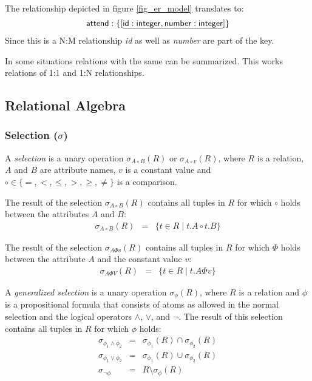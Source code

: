 \begin{example}
The relationship depicted in figure \ref{fig_er_model} translates to:
\[
\mathsf{attend : \{[\underline{id:integer, number:integer}]\}}
\]
Since this is a N:M relationship \textit{id} as well as \textit{number} are part of the key.
\end{example}

In some situations relations with the same can be summarized. This works relations of 1:1 and 1:N relationships.




\subsection{Relational Algebra}




\subsubsection[Selection]{Selection ($\sigma$)}

A \emph{selection} is a unary operation $\sigma_{A \circ  B}(R)$ or $\sigma_{A \circ v}(R)$, where $R$ is a relation, $A$ and $B$ are attribute names, $v$ is a constant value and $\circ \in \{=,<,\leq,>,\geq,\neq\}$ is a comparison.

The result of the selection $\sigma_{A \circ B}(R)$ contains all tuples in $R$ for which $\circ$ holds between the attributes $A$ and $B$:
\[ \begin{array}{rcl}
\sigma_{A \circ B}(R) & = & \{ t \in R \mid t.A \circ t.B \}
\end{array} \]

The result of the selection $\sigma_{A \Phi v}(R)$ contains all tuples in $R$ for which $\Phi$ holds between the attribute $A$ and the constant value $v$:
\[ \begin{array}{rcl}
\sigma_{A \Phi V}(R) & = & \{ t \in R \mid t.A \Phi v \}
\end{array} \]

A \emph{generalized selection} is a unary operation $\sigma_\phi(R)$, where $R$ is a relation and $\phi$ is a propositional formula that consists of atoms as allowed in the normal selection and the logical operators $\wedge$, $\vee$, and $\neg$. The result of this selection contains all tuples in $R$ for which $\phi$ holds:
\[ \begin{array}{rcl}
\sigma_{\phi_1 \wedge \phi_2} & = & \sigma_{\phi_1}(R) \cap \sigma_{\phi_2}(R) \\[0.5em]
\sigma_{\phi_1 \vee \phi_2} & = & \sigma_{\phi_1}(R) \cup \sigma_{\phi_2}(R) \\[0.5em]
\sigma_{\neg \phi} & = & R \setminus \sigma_{\phi}(R) 
\end{array} \]


